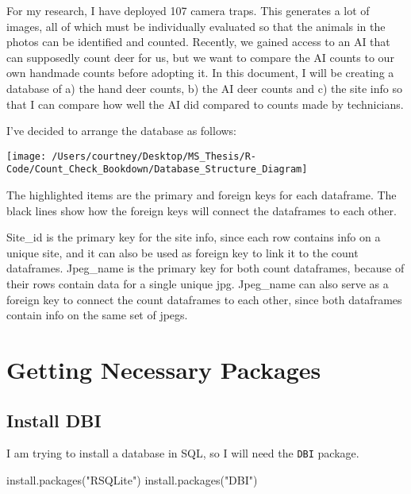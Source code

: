 \documentclass[
]{book}
\newenvironment{Shaded}{\begin{snugshade}}{\end{snugshade}}
\newcommand{\FunctionTok}[1]{\textcolor[rgb]{0.00,0.00,0.00}{#1}}
\newcommand{\NormalTok}[1]{#1}
\newcommand{\StringTok}[1]{\textcolor[rgb]{0.31,0.60,0.02}{#1}}
\begin{document}
For my research, I have deployed 107 camera traps. This generates a lot of images, all of which must be individually evaluated so that the animals in the photos can be identified and counted. Recently, we gained access to an AI that can supposedly count deer for us, but we want to compare the AI counts to our own handmade counts before adopting it. In this document, I will be creating a database of a) the hand deer counts, b) the AI deer counts and c) the site info so that I can compare how well the AI did compared to counts made by technicians.

I've decided to arrange the database as follows:

\begin{center}\texttt{[image: /Users/courtney/Desktop/MS\_Thesis/R-Code/Count\_Check\_Bookdown/Database\_Structure\_Diagram]} \end{center}

The highlighted items are the primary and foreign keys for each dataframe. The black lines show how the foreign keys will connect the dataframes to each other.

Site\_id is the primary key for the site info, since each row contains info on a unique site, and it can also be used as foreign key to link it to the count dataframes. Jpeg\_name is the primary key for both count dataframes, because of their rows contain data for a single unique jpg. Jpeg\_name can also serve as a foreign key to connect the count dataframes to each other, since both dataframes contain info on the same set of jpegs.

\hypertarget{getting-necessary-packages}{%
\section{Getting Necessary Packages}\label{getting-necessary-packages}}

\hypertarget{install-dbi}{%
\subsection{Install DBI}\label{install-dbi}}

I am trying to install a database in SQL, so I will need the \texttt{DBI} package.

\begin{Shaded}
\begin{Highlighting}[]
\FunctionTok{install.packages}\NormalTok{(}\StringTok{"RSQLite"}\NormalTok{)}
\FunctionTok{install.packages}\NormalTok{(}\StringTok{"DBI"}\NormalTok{)}
\end{Highlighting}
\end{Shaded}
\end{document}
